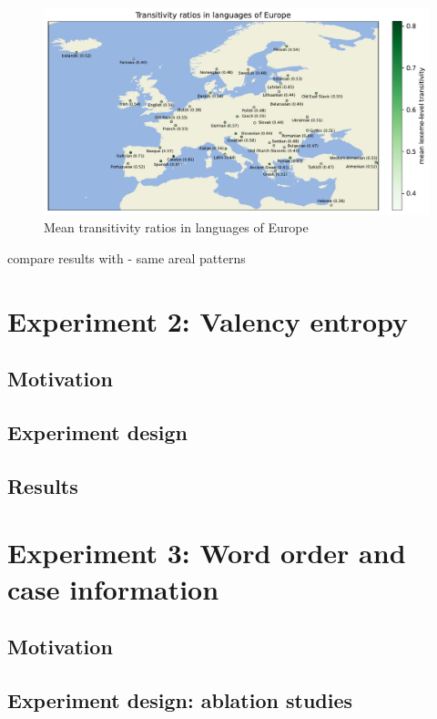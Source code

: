 
\begin{figure}
  \centering
  \includegraphics[width=\textwidth]{figures/transitivity_europe.pdf}
  \caption{Mean transitivity ratios in languages of Europe}
  \label{fig:transitivity_europe}
\end{figure}

compare results with \citet{say2014} - same areal patterns

\section{Experiment 2: Valency entropy}
\subsection{Motivation}
\subsection{Experiment design}
\subsection{Results}

\section{Experiment 3: Word order and case information}
\subsection{Motivation}
\subsection{Experiment design: ablation studies}
